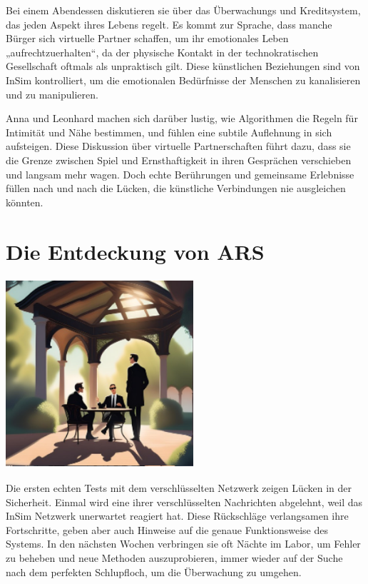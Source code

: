 \documentclass[
]{article}
\begin{document}
Bei einem Abendessen diskutieren sie über das Überwachungs und
Kreditsystem, das jeden Aspekt ihres Lebens regelt. Es kommt zur
Sprache, dass manche Bürger sich virtuelle Partner schaffen, um ihr
emotionales Leben „aufrechtzuerhalten``, da der physische Kontakt in der
technokratischen Gesellschaft oftmals als unpraktisch gilt. Diese
künstlichen Beziehungen sind von InSim kontrolliert, um die emotionalen
Bedürfnisse der Menschen zu kanalisieren und zu manipulieren.

Anna und Leonhard machen sich darüber lustig, wie Algorithmen die Regeln
für Intimität und Nähe bestimmen, und fühlen eine subtile Auflehnung in
sich aufsteigen. Diese Diskussion über virtuelle Partnerschaften führt
dazu, dass sie die Grenze zwischen Spiel und Ernsthaftigkeit in ihren
Gesprächen verschieben und langsam mehr wagen. Doch echte Berührungen
und gemeinsame Erlebnisse füllen nach und nach die Lücken, die
künstliche Verbindungen nie ausgleichen könnten.

\section{Die Entdeckung von ARS}\label{die-entdeckung-von-ars}

\includegraphics[width=2.73958in,height=2.76042in]{media/image4.png}

Die ersten echten Tests mit dem verschlüsselten Netzwerk zeigen Lücken
in der Sicherheit. Einmal wird eine ihrer verschlüsselten Nachrichten
abgelehnt, weil das InSim Netzwerk unerwartet reagiert hat. Diese
Rückschläge verlangsamen ihre Fortschritte, geben aber auch Hinweise auf
die genaue Funktionsweise des Systems. In den nächsten Wochen verbringen
sie oft Nächte im Labor, um Fehler zu beheben und neue Methoden
auszuprobieren, immer wieder auf der Suche nach dem perfekten
Schlupfloch, um die Überwachung zu umgehen.
\end{document}

